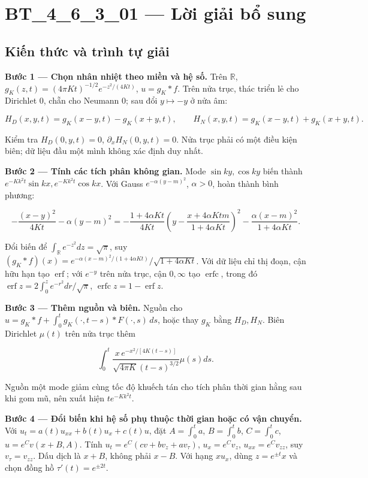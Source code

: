 \documentclass[10pt,a4paper]{article}
\begin{document}
\section*{BT\_4\_6\_3\_01 — Lời giải bổ sung}
\subsection*{Kiến thức và trình tự giải}
\textbf{Bước 1 — Chọn nhân nhiệt theo miền và hệ số.} Trên $\mathbb R$, $g_K(z,t)=(4\pi Kt)^{-1/2}e^{-z^2/(4Kt)}$, $u=g_K*f$. Trên nửa trục, thác triển lẻ cho Dirichlet $0$, chẵn cho Neumann $0$; sau đổi $y\mapsto-y$ ở nửa âm:


\[
H_D(x,y,t)=g_K(x-y,t)-g_K(x+y,t),\qquad
H_N(x,y,t)=g_K(x-y,t)+g_K(x+y,t).
\]


Kiểm tra $H_D(0,y,t)=0$, $\partial_xH_N(0,y,t)=0$. Nửa trục phải có một điều kiện biên; dữ liệu đầu một mình không xác định duy nhất.

\textbf{Bước 2 — Tính các tích phân không gian.} Mode $\sin ky,\cos ky$ biến thành $e^{-Kk^2t}\sin kx,e^{-Kk^2t}\cos kx$. Với Gauss $e^{-\alpha(y-m)^2}$, $\alpha>0$, hoàn thành bình phương:


\[
-\frac{(x-y)^2}{4Kt}-\alpha(y-m)^2
=-\frac{1+4\alpha Kt}{4Kt}\left(y-\frac{x+4\alpha Ktm}{1+4\alpha Kt}\right)^2
-\frac{\alpha(x-m)^2}{1+4\alpha Kt}.
\]


Đổi biến để $\int_{\mathbb R}e^{-z^2}dz=\sqrt\pi$, suy $(g_K*f)(x)=e^{-\alpha(x-m)^2/(1+4\alpha Kt)}/\sqrt{1+4\alpha Kt}$. Với dữ liệu chỉ thị đoạn, cận hữu hạn tạo $\operatorname{erf}$; với $e^{-y}$ trên nửa trục, cận $0,\infty$ tạo $\operatorname{erfc}$, trong đó $\operatorname{erf}z=2\int_0^ze^{-r^2}dr/\sqrt\pi$, $\operatorname{erfc}z=1-\operatorname{erf}z$.

\textbf{Bước 3 — Thêm nguồn và biên.} Nguồn cho $u=g_K*f+\int_0^tg_K(\cdot,t-s)*F(\cdot,s)\,ds$, hoặc thay $g_K$ bằng $H_D,H_N$. Biên Dirichlet $\mu(t)$ trên nửa trục thêm


\[
\int_0^t\frac{x\,e^{-x^2/[4K(t-s)]}}{\sqrt{4\pi K}(t-s)^{3/2}}\mu(s)ds.
\]


Nguồn một mode giảm cùng tốc độ khuếch tán cho tích phân thời gian hằng sau khi gom mũ, nên xuất hiện $te^{-Kk^2t}$.

\textbf{Bước 4 — Đổi biến khi hệ số phụ thuộc thời gian hoặc có vận chuyển.} Với $u_t=a(t)u_{xx}+b(t)u_x+c(t)u$, đặt $A=\int_0^ta$, $B=\int_0^tb$, $C=\int_0^tc$, $u=e^Cv(x+B,A)$. Tính $u_t=e^C(cv+bv_z+av_\tau)$, $u_x=e^Cv_z$, $u_{xx}=e^Cv_{zz}$, suy $v_\tau=v_{zz}$. Dấu dịch là $x+B$, không phải $x-B$. Với hạng $xu_x$, dùng $z=e^{\pm t}x$ và chọn đồng hồ $\tau'(t)=e^{\pm2t}$.
\end{document}
